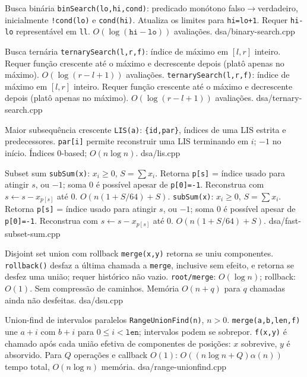 \ifextended

\templateentry
{Busca binária}
{}
{\texttt{binSearch(lo,hi,cond)}: predicado monótono falso$\to$verdadeiro, inicialmente \texttt{!cond(lo)} e \texttt{cond(hi)}. Atualiza os limites para \texttt{hi=lo+1}. Requer \texttt{hi-lo} representável em \texttt{ll}. $O(\log(\mathtt{hi}-\mathtt{lo}))$ avaliações.}
{dsa/binary-search.cpp}

\templateentry
{Busca ternária}
{\texttt{ternarySearch(l,r,f)}: índice de máximo em $[l,r]$ inteiro. Requer função crescente até o máximo e decrescente depois (platô apenas no máximo). $O(\log(r-l+1))$ avaliações.}
{\texttt{ternarySearch(l,r,f)}: índice de máximo em $[l,r]$ inteiro. Requer função crescente até o máximo e decrescente depois (platô apenas no máximo). $O(\log(r-l+1))$ avaliações.}
{dsa/ternary-search.cpp}

\templateentry
{Maior subsequência crescente}
{}
{\texttt{LIS(a)}: \texttt{\{id,par\}}, índices de uma LIS estrita e predecessores. \texttt{par[i]} permite reconstruir uma LIS terminando em $i$; $-1$ no início. Índices 0-based; $O(n\log n)$.}
{dsa/lis.cpp}

\fi

\templateentry
{Subset sum}
{\texttt{subSum(x)}: $x_i\ge0$, $S=\sum x_i$. Retorna \texttt{p[s]} = índice usado para atingir $s$, ou $-1$; soma 0 é possível apesar de \texttt{p[0]=-1}. Reconstrua com $s\gets s-x_{p[s]}$ até 0. $O(n(1+S/64)+S)$.}
{\texttt{subSum(x)}: $x_i\ge0$, $S=\sum x_i$. Retorna \texttt{p[s]} = índice usado para atingir $s$, ou $-1$; soma 0 é possível apesar de \texttt{p[0]=-1}. Reconstrua com $s\gets s-x_{p[s]}$ até 0. $O(n(1+S/64)+S)$.}
{dsa/fast-subset-sum.cpp}

\ifextended

\templateentry
{Disjoint set union com rollback}
{}
{\texttt{merge(x,y)} retorna se uniu componentes. \texttt{rollback()} desfaz a última chamada a \texttt{merge}, inclusive sem efeito, e retorna se desfez uma união; requer histórico não vazio. \texttt{root/merge}: $O(\log n)$; rollback: $O(1)$. Sem compressão de caminhos. Memória $O(n+q)$ para $q$ chamadas ainda não desfeitas.}
{dsa/dsu.cpp}

\templateentry
{Union-find de intervalos paralelos}
{}
{\texttt{RangeUnionFind(n)}, $n>0$. \texttt{merge(a,b,len,f)} une $a+i$ com $b+i$ para $0\le i<\mathtt{len}$; intervalos podem se sobrepor. \texttt{f(x,y)} é chamado após cada união efetiva de componentes de posições: $x$ sobrevive, $y$ é absorvido. Para $Q$ operações e callback $O(1)$: $O((n\log n+Q)\alpha(n))$ tempo total, $O(n\log n)$ memória.}
{dsa/range-unionfind.cpp}

